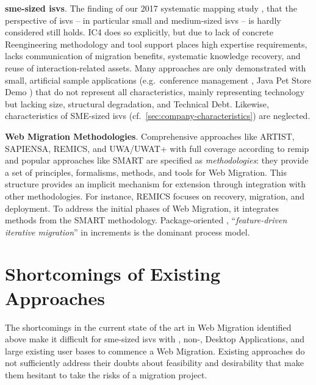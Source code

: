 \textbf{\gls{sme}-sized \glspl{isv}}. The finding of our 2017 systematic mapping study \autocite{Heil2017Survey}, that the perspective of \glspl{isv} -- in particular small and medium-sized \glspl{isv} -- is hardly considered still holds.
IC4 does so explicitly, but due to lack of concrete \gls{Reengineering} methodology and tool support places high expertise requirements, lacks communication of migration benefits, systematic knowledge recovery, and reuse of interaction-related assets.
Many approaches are only demonstrated with small, artificial sample applications (e.g.~conference management \autocite{Sosa2014MigraSOA}, Java Pet Store Demo \autocite{Rodriguez-Echeverria2012MIGRARIA}) that do not represent all  characteristics, mainly representing  technology but lacking size, structural degradation, and \gls{Technical Debt}.
Likewise, characteristics of SME-sized \glspl{isv} (cf.~\cref{sec:company-characteristics}) are neglected.

\textbf{\gls{Web Migration} Methodologies}.
Comprehensive approaches like ARTIST, SAPIENSA, REMICS, and UWA/UWAT+ with full coverage according to \gls{remip} and popular approaches like SMART are specified as \emph{methodologies}: they provide a set of principles, formalisms, methods, and tools \autocite{Wallmueller2001SoftwareQuality} for \gls{Web Migration}.
This structure provides an implicit mechanism for extension through integration with other methodologies.
For instance, REMICS focuses on recovery, migration, and deployment.
To address the initial phases of \gls{Web Migration}, it integrates methods from the SMART methodology.
Package-oriented \autocite{Brodie1995Migrating},  ``\emph{feature-driven iterative migration}'' \autocite{Menychtas2014ARTISTJournal} in increments is the dominant process model.

\vspace{-27pt}
\hypertarget{sec:sota.shortcomings}{%
\section{Shortcomings of Existing Approaches}\label{sec:sota.shortcomings}}
\vspace{3pt}

The shortcomings in the current state of the art in \gls{Web Migration} identified above make it difficult for \gls{sme}-sized \glspl{isv} with , non-, \glspl{Desktop Application}, and large existing user bases to commence a \gls{Web Migration}.
Existing approaches do not sufficiently address their doubts about feasibility and desirability that make them hesitant to take the risks of a migration project.

